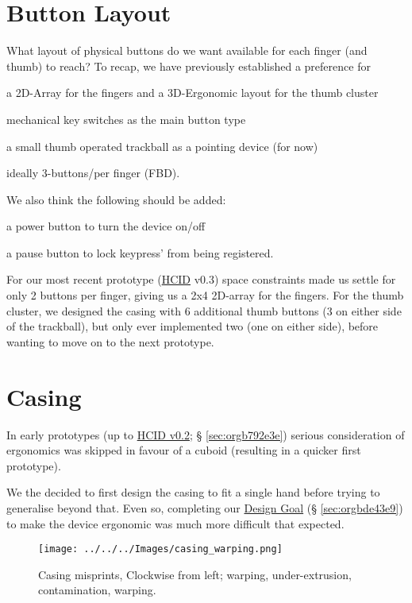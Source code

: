 \documentclass[logo,bsc,singlespacing,parskip]{infthesis}
\begin{document}
\section{Button Layout}
\label{sec:orgd9895d8}
What layout of physical buttons do we want available for each finger (and thumb) to reach?
To recap, we have previously established a preference for
\begin{enumerate*}[label={\arabic*)}, itemjoin={, \,}, itemjoin*={, and \,}]
\item a 2D-Array for the fingers and a 3D-Ergonomic layout for the thumb cluster
\item mechanical key switches as the main button type
\item a small thumb operated trackball as a pointing device (for now)
\item ideally 3-buttons/per finger (FBD).
\end{enumerate*}
We also think the following should be added:
\begin{enumerate*}[label={\arabic*)}, itemjoin={, \,}, itemjoin*={, and \,}]
\item a power button to turn the device on/off
\item a pause button to lock keypress' from being registered.
\end{enumerate*}

For our most recent prototype (\hyperref[orgc00eca5]{HCID} v0.3) space constraints made us settle for only 2 buttons per finger, giving us a 2x4 2D-array for the fingers.
For the thumb cluster, we designed the casing with 6 additional thumb buttons (3 on either side of the trackball), but only ever implemented two (one on either side), before wanting to move on to the next prototype.
\section{Casing}
\label{sec:orgc689911}
In early prototypes (up to \hyperref[sec:orgb792e3e]{HCID v0.2}; § \ref{sec:orgb792e3e}) serious consideration of ergonomics was skipped in favour of a cuboid (resulting in a quicker first prototype).

We the decided to first design the casing to fit a single hand before trying to generalise beyond that.
Even so, completing our \hyperref[sec:orgbde43e9]{Design Goal} (§ \ref{sec:orgbde43e9}) to make the device ergonomic was much more difficult that expected.

\begin{wrapfigure}{r}{0.6\textwidth}
\centering
\texttt{[image: ../../../Images/casing\_warping.png]}
\caption[Casing misprints]{\label{fig:casing_misprints}Casing misprints, Clockwise from left; warping, under-extrusion, contamination, warping.}
\end{wrapfigure}
\end{document}
